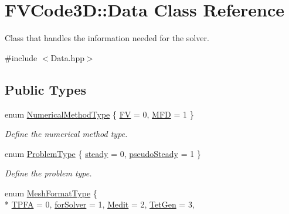 \hypertarget{classFVCode3D_1_1Data}{}\section{F\+V\+Code3D\+:\+:Data Class Reference}
\label{classFVCode3D_1_1Data}


Class that handles the information needed for the solver.  




{\ttfamily \#include $<$Data.\+hpp$>$}

\subsection*{Public Types}
\begin{DoxyCompactItemize}
\item 
enum \hyperlink{classFVCode3D_1_1Data_a5222e1901276af4586befd821445c6cf}{Numerical\+Method\+Type} \{ \hyperlink{classFVCode3D_1_1Data_a5222e1901276af4586befd821445c6cfae6a9edcfa5768dd3908108c297b413f7}{FV} = 0, 
\hyperlink{classFVCode3D_1_1Data_a5222e1901276af4586befd821445c6cfacf4497fa0025d2f6ea6a9b682e384ff3}{M\+FD} = 1
 \}\begin{DoxyCompactList}\small\item\em Define the numerical method type. \end{DoxyCompactList}
\item 
enum \hyperlink{classFVCode3D_1_1Data_af17933074f5acdb699179763e6f43f23}{Problem\+Type} \{ \hyperlink{classFVCode3D_1_1Data_af17933074f5acdb699179763e6f43f23aa01656a6cd37ca152de831adad5d2841}{steady} = 0, 
\hyperlink{classFVCode3D_1_1Data_af17933074f5acdb699179763e6f43f23adf310b8b79bf5a11843828488cb3b46f}{pseudo\+Steady} = 1
 \}\begin{DoxyCompactList}\small\item\em Define the problem type. \end{DoxyCompactList}
\item 
enum \hyperlink{classFVCode3D_1_1Data_a6a9aa6abc2ca3c85be8578d82a61a9c6}{Mesh\+Format\+Type} \{ \\*
\hyperlink{classFVCode3D_1_1Data_a6a9aa6abc2ca3c85be8578d82a61a9c6a41e16e40b05a40c861dae13e7d056daf}{T\+P\+FA} = 0, 
\hyperlink{classFVCode3D_1_1Data_a6a9aa6abc2ca3c85be8578d82a61a9c6aa97c4d4a0aa98b96be77e4d0a5e1e8fb}{for\+Solver} = 1, 
\hyperlink{classFVCode3D_1_1Data_a6a9aa6abc2ca3c85be8578d82a61a9c6a5122019b85fafb0f64f79baf96593d52}{Medit} = 2, 
\hyperlink{classFVCode3D_1_1Data_a6a9aa6abc2ca3c85be8578d82a61a9c6a801f19d5251b0e21edfed0b05fb1ac99}{Tet\+Gen} = 3, 

\end{DoxyCompactItemize}
